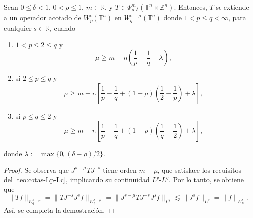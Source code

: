 \begin{theorem}
	Sean $0\leq\delta<1$, $0<\rho\leq 1$, $m\in\mathbb{R}$, y $T\in \Psi^m_{\rho,\delta}(\mathbb{T}^n\times\mathbb{Z}^n)$. Entonces, $T$ se extiende a un operador acotado de $W^{s}_p(\mathbb{T}^n)$ en $W^{s-\mu}_q (\mathbb{T}^n)$ donde $1<p\leq q<\infty$, para cualquier $s\in\mathbb{R}$, cuando 
	\begin{enumerate}
		\item $1<p\leq 2 \leq q$ y 
		\begin{equation*}
			\mu \geq m + n \left( \frac{1}{p} - \frac{1}{q} + \lambda
			\right),
		\end{equation*}
		\item si $2 \leq p \leq q$ y 
		\begin{equation*}
			\mu \geq m + n \left[ \frac{1}{p} - \frac{1}{q} + (1-\rho) \left( \frac{1}{2} - \frac{1}{p}
			\right)
			+ \lambda
			\right],
		\end{equation*}
		\item si $p\leq q \leq 2$ y 
		\begin{equation*}
			\mu \geq m + n \left[ \frac{1}{p} - \frac{1}{q} + (1-\rho) \left( \frac{1}{q} - \frac{1}{2}
			\right)
			+ \lambda
			\right],
		\end{equation*}
	\end{enumerate}
	donde $\lambda := \max\{ 0, (\delta-\rho)/2 \}$. 
\end{theorem}
\begin{proof}
	Se observa que $J^{s-\mu}T J^{-s}$ tiene orden $m-\mu$, que satisface los requisitos del \cref{teo:cotas-Lp-Lq}, implicando su continuidad $L^p$-$L^q$. Por lo tanto, se obtiene que
	\begin{equation*}
		\|T f\|_{W^{s-\mu}_q} = \|T J^{-s}J^sf\|_{W^{s-\mu}_q} 
		= \|J^{s-\mu}T J^{-s}J^sf\|_{L^q}
		\lesssim \|J^sf\|_{L^p} = \|f\|_{W^s_p}. 
	\end{equation*}
	Así, se completa la demostración.
\end{proof}




